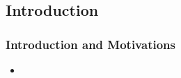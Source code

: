 
\subsection{Introduction}

\begin{frame}
\frametitle{Introduction and Motivations}
\begin{itemize}
	\item 
\end{itemize}
\end{frame}
